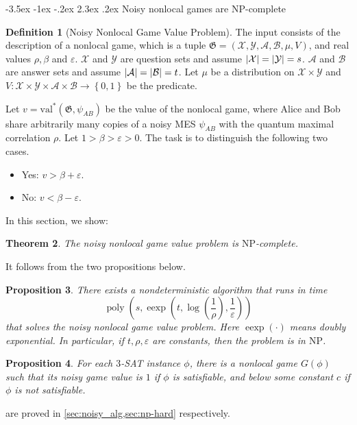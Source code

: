 \documentclass[11pt]{article}
\makeatletter
\renewcommand{\section}{\@startsection {section}{1}{\z@}%
             {-3.5ex \@plus -1ex \@minus -.2ex}%
             {2.3ex \@plus .2ex}%
             {\normalfont\Large\scshape\bfseries}}
\theoremstyle{plain}
\newtheorem{theorem}{Theorem}[section]
\newtheorem{prop}[theorem]{Proposition}
\theoremstyle{definition}
\newtheorem{definition}[theorem]{Definition}
\newcommand {\set} [1] {\ensuremath{ \left\lbrace #1 \right\rbrace }}
\newcommand {\br} [1] {\ensuremath{ \left( #1 \right) }}
\DeclarePairedDelimiter{\abs}{\lvert}{\rvert}
\newcommand{\poly} {\ensuremath{\operatorname{poly}}}
\newcommand{\ep} {\ensuremath{\varepsilon}}
\newcommand{\calX}{\mathcal{X}}
\newcommand{\calY}{\mathcal{Y}}
\newcommand{\calA}{\mathcal{A}}
\newcommand{\calB}{\mathcal{B}}
\newcommand{\1}{\mathbb{1}} %
\newcommand{\val}{\mathrm{val}}
\newcommand{\NP}{\mathrm{NP}}
\makeatother
\begin{document}
%
\section{Noisy nonlocal games are NP-complete}

\begin{definition}[Noisy Nonlocal Game Value Problem]\label{def:nonlocalgameproblem}
The input consists of the description of a nonlocal game,
which is a tuple $\mathfrak{G}=\br{\calX, \calY, \calA, \calB, \mu, V}$,
and real values $\rho, \beta$ and $\ep$.
$\calX$ and $\calY$ are question sets and assume $\abs{\calX} = \abs{\calY} = s$.
$\calA$ and $\calB$ are answer sets and assume $\abs{\calA} = \abs{\calB} = t$.
Let $\mu$ be a distribution on $\calX\times\calY$ and $V: \calX\times\calY\times\calA\times\calB\to\set{0,1}$ be the predicate.

Let $v=\val^\ast(\mathfrak{G}, \psi_{AB})$ be the value of the nonlocal game,
where Alice and Bob share arbitrarily many copies of a noisy MES $\psi_{AB}$ with the quantum maximal correlation $\rho$.
Let $1>\beta> \ep>0$. The task is to distinguish the following two cases.
\begin{itemize}
    \item Yes: $v>\beta+\ep$.
    \item No: $v<\beta-\ep$.
\end{itemize}
\end{definition}
In this section, we show: 
\begin{theorem}
    The noisy nonlocal game value problem is $\NP$-complete.
\end{theorem}
It follows from the two propositions below.

\begin{prop}\label{thm:nonlocal-game-is-NP}
  There exists a nondeterministic algorithm that runs in time
  $$\poly\br{s, \operatorname{eexp}\br{t, \log\br{\frac{1}{\rho}}, \frac{1}{\ep}}}$$
  that solves the noisy nonlocal game value problem.
  Here $\operatorname{eexp}(\cdot)$ means doubly exponential.
  In particular, if $t, \rho, \ep$ are constants, then the problem is in $\mathrm{NP}$.
\end{prop}
\begin{prop}
    \label{prop:noisy-np-hard}
    For each $3$-SAT instance $\phi$, there is a nonlocal game $G(\phi)$ such that
    its noisy game value is $1$ if $\phi$ is satisfiable, and below some constant $c$ if
    $\phi$ is not satisfiable.
\end{prop}
 are proved in \cref{sec:noisy_alg,sec:np-hard} respectively.
\end{document}
